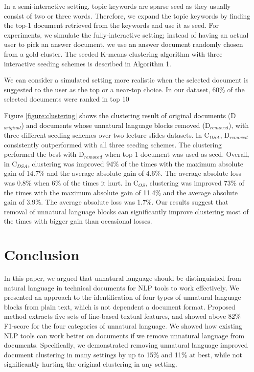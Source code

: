 \documentclass[11pt,letterpaper]{article}
\begin{document}
In a semi-interactive setting, topic keywords are sparse seed as they usually consist of two or three words. Therefore, we expand the topic keywords by finding the top-1 document retrieved from the keywords and use it as seed. For experiments, we simulate the fully-interactive setting; instead of having an actual user to pick an answer document, we use an answer document randomly chosen from a gold cluster. The seeded K-means clustering algorithm with three interactive seeding schemes is described in Algorithm 1. 

We can consider a simulated setting more realistic when the selected document is suggested to the user as the top or a near-top choice. In our dataset, 60\% of the selected documents were ranked in top 10 

Figure \ref{figure:clustering} shows the clustering result of original documents (D$_{original}$) and documents whose unnatural language blocks removed (D$_{removed}$), with three different seeding schemes over two lecture slides datasets. In C$_{DSA}$, D$_{removed}$ consistently outperformed with all three seeding schemes. The clustering performed the best with D$_{removed}$ when top-1 document was used as seed. Overall, in C$_{DSA}$, clustering was improved 94\% of the times with the maximum absolute gain of 14.7\% and the average absolute gain of 4.6\%. The average absolute loss was 0.8\% when 6\% of the times it hurt. In C$_{OS}$, clustering was improved 73\% of the times with the maximum absolute gain of 11.4\% and the average absolute gain of 3.9\%. The average absolute loss was 1.7\%. Our results suggest that removal of unnatural language blocks can significantly improve clustering most of the times with bigger gain than occasional losses. 

  
  

  
  

\vspace{-0.5em}
\section{Conclusion}

In this paper, we argued that unnatural language should be distinguished from natural language in technical documents for NLP tools to work effectively. We presented an approach to the identification of four types of unnatural language blocks from plain text, which is not dependent a document format. Proposed method extracts five sets of line-based textual features, and showed above 82\% F1-score for the four categories of unnatural language.  
We showed how existing NLP tools can work better on documents if we remove unnatural language from documents. Specifically, we demonstrated removing unnatural language improved document clustering in many settings by up to 15\% and 11\% at best, while not significantly hurting the original clustering in any setting. 
\end{document}
